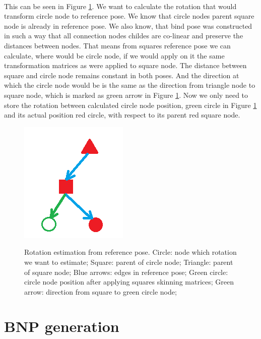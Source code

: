 \paragraph{}
This can be seen in Figure \ref{fig:DoF_estimation_ilu}. We want to calculate the rotation that would transform circle node to reference pose. We know that circle nodes parent square node is already in reference pose. We also know, that bind pose was constructed in such a way that all connection nodes childes are co-linear and preserve the distances between nodes. That means from squares reference pose we can calculate, where would be circle node, if we would apply on it the same transformation matrices as were applied to square node. The distance between square and circle node remains constant in both poses. And the direction at which the circle node would be is the same as the direction from triangle node to square node, which is marked as green arrow in Figure \ref{fig:DoF_estimation_ilu}. Now we only need to store the rotation between calculated circle node position, green circle in Figure \ref{fig:DoF_estimation_ilu} and its actual position red circle, with respect to its parent red square node.

\begin{figure}[h]
    \centering
    \includegraphics[]{images/DoF_estimation.png}
    \label{fig:DoF_estimation_ilu}
    \caption[Rotation estimation from reference pose]{Rotation estimation from reference pose. Circle: node which rotation we want to estimate; Square: parent of circle node; Triangle: parent of square node; Blue arrows: edges in reference pose; Green circle: circle node position after applying squares skinning matrices; Green arrow: direction from square to green circle node;}
\end{figure}

\section{BNP generation}
